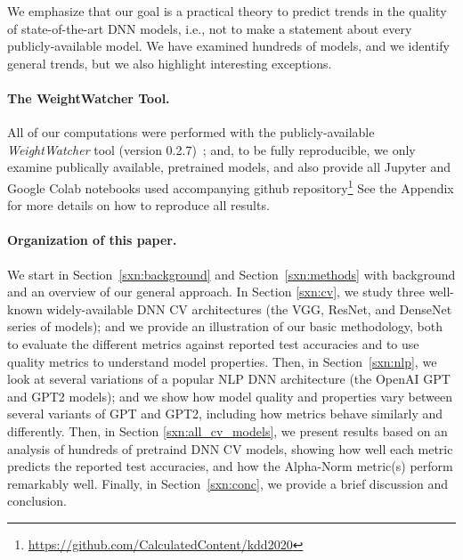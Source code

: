 \noindent
We emphasize that our goal is a practical theory to predict trends in the quality of state-of-the-art DNN models, i.e., not to make a statement about every publicly-available model.
We have examined hundreds of models, and we identify general trends, but we also highlight interesting exceptions.

\paragraph{The WeightWatcher Tool.}

All of our computations were performed with the publicly-available \emph{WeightWatcher} tool (version 0.2.7)~\cite{weightwatcher_package};
and, to be fully reproducible, we only examine publically available, pretrained models, and
also provide all Jupyter and Google Colab notebooks used accompanying github 
repository\footnote{\url{https://github.com/CalculatedContent/kdd2020}
}
See the Appendix for more details on how to reproduce all results.


\paragraph{Organization of this paper.}

We start in Section~\ref{sxn:background} and Section~\ref{sxn:methods} with background and an overview of our general approach.
In Section \ref{sxn:cv}, we study three well-known widely-available DNN CV architectures (the VGG, ResNet, and DenseNet series of models); and we provide an illustration of our basic methodology, both to evaluate the different metrics against reported test accuracies and to use quality metrics to understand model properties.
Then, in Section~\ref{sxn:nlp}, we look at several variations of a popular NLP DNN architecture (the OpenAI GPT and GPT2 models); and we show how model quality and properties vary between several variants of GPT and GPT2, including how metrics behave similarly and differently.
Then, in Section \ref{sxn:all_cv_models}, we present results based on an analysis of hundreds of pretraind DNN CV models, showing how well each metric predicts the reported test accuracies, and how the Alpha-Norm metric(s) perform remarkably well.
Finally, in Section~\ref{sxn:conc}, we provide a brief discussion and conclusion.




